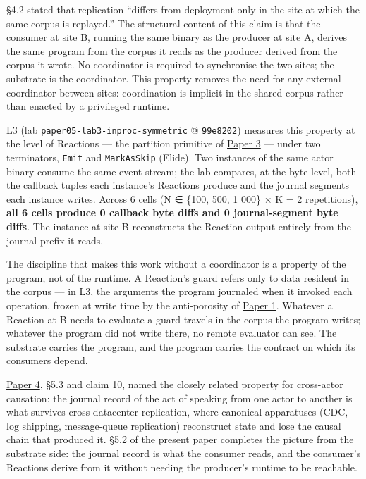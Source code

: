 \documentclass[
]{article}
\begin{document}
§4.2 stated that replication ``differs from deployment only in the site
at which the same corpus is replayed.'' The structural content of this
claim is that the consumer at site B, running the same binary as the
producer at site A, derives the same program from the corpus it reads as
the producer derived from the corpus it wrote. No coordinator is
required to synchronise the two sites; the substrate is the coordinator.
This property removes the need for any external coordinator between
sites: coordination is implicit in the shared corpus rather than enacted
by a privileged runtime.

L3 (lab
\href{data/paper05-lab3-inproc-symmetric/}{\texttt{paper05-lab3-inproc-symmetric}}
@ \texttt{99e8202}) measures this property at the level of Reactions ---
the partition primitive of \href{03-reactions-and-partition.md}{Paper 3}
--- under two terminators, \texttt{Emit} and \texttt{MarkAsSkip}
(Elide). Two instances of the same actor binary consume the same event
stream; the lab compares, at the byte level, both the callback tuples
each instance's Reactions produce and the journal segments each instance
writes. Across 6 cells (N ∈ \{100, 500, 1 000\} × K = 2 repetitions),
\textbf{all 6 cells produce 0 callback byte diffs and 0 journal-segment
byte diffs}. The instance at site B reconstructs the Reaction output
entirely from the journal prefix it reads.

The discipline that makes this work without a coordinator is a property
of the program, not of the runtime. A Reaction's guard refers only to
data resident in the corpus --- in L3, the arguments the program
journaled when it invoked each operation, frozen at write time by the
anti-porosity of \href{01-anti-porosity.md}{Paper 1}. Whatever a
Reaction at B needs to evaluate a guard travels in the corpus the
program writes; whatever the program did not write there, no remote
evaluator can see. The substrate carries the program, and the program
carries the contract on which its consumers depend.

\href{04-cross-actor-continuity.md}{Paper 4}, §5.3 and claim 10, named
the closely related property for cross-actor causation: the journal
record of the act of speaking from one actor to another is what survives
cross-datacenter replication, where canonical apparatuses (CDC, log
shipping, message-queue replication) reconstruct state and lose the
causal chain that produced it. §5.2 of the present paper completes the
picture from the substrate side: the journal record is what the consumer
reads, and the consumer's Reactions derive from it without needing the
producer's runtime to be reachable.
\end{document}
